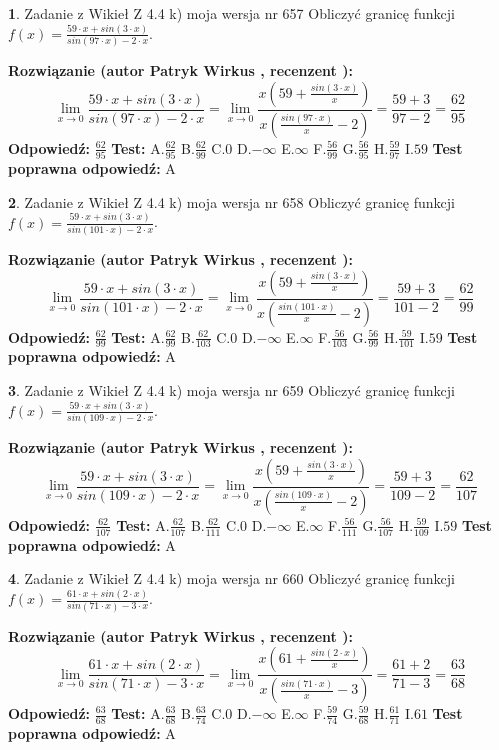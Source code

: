 \documentclass[12pt, a4paper]{article}
\theoremstyle{definition} %
\newtheorem{zad}{}
\newcommand{\zadStart}[1]{\begin{zad}#1\newline}
\newcommand{\zadStop}{\end{zad}}
\newcommand{\rozwStart}[2]{\noindent \textbf{Rozwiązanie (autor #1 , recenzent #2): }\newline}
\newcommand{\rozwStop}{\newline}
\newcommand{\odpStart}{\noindent \textbf{Odpowiedź:}\newline}
\newcommand{\odpStop}{\newline}
\newcommand{\testStart}{\noindent \textbf{Test:}\newline}
\newcommand{\testStop}{\newline}
\newcommand{\kluczStart}{\noindent \textbf{Test poprawna odpowiedź:}\newline}
\newcommand{\kluczStop}{\newline}
\begin{document}
\zadStart{Zadanie z Wikieł Z 4.4 k) moja wersja nr 657}
Obliczyć granicę funkcji $f(x)=\frac{59\cdot x +sin(3\cdot x)}{sin(97\cdot x) -2\cdot x}$.
\zadStop
\rozwStart{Patryk Wirkus}{}
$$\lim\limits_{x\to 0}\frac{59\cdot x +sin(3\cdot x)}{sin(97\cdot x) -2\cdot x}
=\lim\limits_{x\to 0}\frac{x(59+\frac{sin(3\cdot x)}{x})}{x(\frac{sin(97\cdot x)}{x}-2)}
=\frac{59+3}{97-2} = \frac{62}{95}$$
\rozwStop
\odpStart
$\frac{62}{95}$
\odpStop
\testStart
A.$\frac{62}{95}$
B.$\frac{62}{99}$
C.$0$
D.$-\infty$
E.$\infty$
F.$\frac{56}{99}$
G.$\frac{56}{95}$
H.$\frac{59}{97}$
I.$59$
\testStop
\kluczStart
A
\kluczStop



\zadStart{Zadanie z Wikieł Z 4.4 k) moja wersja nr 658}
Obliczyć granicę funkcji $f(x)=\frac{59\cdot x +sin(3\cdot x)}{sin(101\cdot x) -2\cdot x}$.
\zadStop
\rozwStart{Patryk Wirkus}{}
$$\lim\limits_{x\to 0}\frac{59\cdot x +sin(3\cdot x)}{sin(101\cdot x) -2\cdot x}
=\lim\limits_{x\to 0}\frac{x(59+\frac{sin(3\cdot x)}{x})}{x(\frac{sin(101\cdot x)}{x}-2)}
=\frac{59+3}{101-2} = \frac{62}{99}$$
\rozwStop
\odpStart
$\frac{62}{99}$
\odpStop
\testStart
A.$\frac{62}{99}$
B.$\frac{62}{103}$
C.$0$
D.$-\infty$
E.$\infty$
F.$\frac{56}{103}$
G.$\frac{56}{99}$
H.$\frac{59}{101}$
I.$59$
\testStop
\kluczStart
A
\kluczStop



\zadStart{Zadanie z Wikieł Z 4.4 k) moja wersja nr 659}
Obliczyć granicę funkcji $f(x)=\frac{59\cdot x +sin(3\cdot x)}{sin(109\cdot x) -2\cdot x}$.
\zadStop
\rozwStart{Patryk Wirkus}{}
$$\lim\limits_{x\to 0}\frac{59\cdot x +sin(3\cdot x)}{sin(109\cdot x) -2\cdot x}
=\lim\limits_{x\to 0}\frac{x(59+\frac{sin(3\cdot x)}{x})}{x(\frac{sin(109\cdot x)}{x}-2)}
=\frac{59+3}{109-2} = \frac{62}{107}$$
\rozwStop
\odpStart
$\frac{62}{107}$
\odpStop
\testStart
A.$\frac{62}{107}$
B.$\frac{62}{111}$
C.$0$
D.$-\infty$
E.$\infty$
F.$\frac{56}{111}$
G.$\frac{56}{107}$
H.$\frac{59}{109}$
I.$59$
\testStop
\kluczStart
A
\kluczStop



\zadStart{Zadanie z Wikieł Z 4.4 k) moja wersja nr 660}
Obliczyć granicę funkcji $f(x)=\frac{61\cdot x +sin(2\cdot x)}{sin(71\cdot x) -3\cdot x}$.
\zadStop
\rozwStart{Patryk Wirkus}{}
$$\lim\limits_{x\to 0}\frac{61\cdot x +sin(2\cdot x)}{sin(71\cdot x) -3\cdot x}
=\lim\limits_{x\to 0}\frac{x(61+\frac{sin(2\cdot x)}{x})}{x(\frac{sin(71\cdot x)}{x}-3)}
=\frac{61+2}{71-3} = \frac{63}{68}$$
\rozwStop
\odpStart
$\frac{63}{68}$
\odpStop
\testStart
A.$\frac{63}{68}$
B.$\frac{63}{74}$
C.$0$
D.$-\infty$
E.$\infty$
F.$\frac{59}{74}$
G.$\frac{59}{68}$
H.$\frac{61}{71}$
I.$61$
\testStop
\kluczStart
A
\kluczStop
\end{document}
